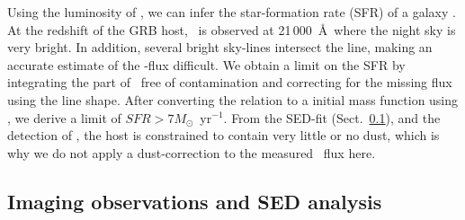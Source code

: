 \documentclass{aa}    %
\begin{document}
Using the luminosity of \ha, we can infer the star-formation rate (SFR) of a 
galaxy \citep{Kennicutt1998}. At the redshift of the GRB host, \ha~is observed at 
21\,000~\AA~where the night sky is very bright. In addition, several bright sky-lines 
intersect the line, making an accurate estimate of the \ha-flux difficult. 
We obtain a limit on the SFR by integrating the part of \ha~free of contamination and 
correcting for the missing flux using the line shape. After converting the 
\citet{Kennicutt1998} relation to a \citet{Chabrier2003} initial mass function using
\citet{Madau2014}, we derive a limit of $SFR > 7 M_\odot$~yr$^{-1}$. 
From the SED-fit (Sect.~\ref{SED}), and the detection of \lya, the host is
constrained to contain very little or no dust, which is why we do not apply 
a dust-correction to the measured \ha~flux here. 





\subsection{Imaging observations and SED analysis} \label{SED}
\end{document}
